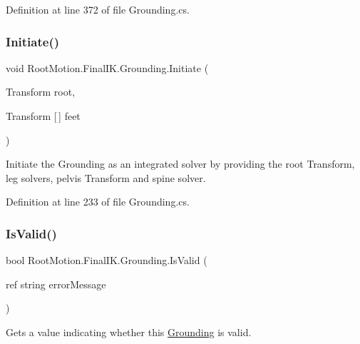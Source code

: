 Definition at line 372 of file Grounding.\+cs.

\mbox{\label{class_root_motion_1_1_final_i_k_1_1_grounding_a2e0c3b799348ec458e5049b7ed3a1969}} 
\subsubsection{\texorpdfstring{Initiate()}{Initiate()}}
{\footnotesize\ttfamily void Root\+Motion.\+Final\+I\+K.\+Grounding.\+Initiate (\begin{DoxyParamCaption}\item[{Transform}]{root,  }\item[{Transform \mbox{[}$\,$\mbox{]}}]{feet }\end{DoxyParamCaption})}



Initiate the Grounding as an integrated solver by providing the root Transform, leg solvers, pelvis Transform and spine solver. 



Definition at line 233 of file Grounding.\+cs.

\mbox{\label{class_root_motion_1_1_final_i_k_1_1_grounding_a2b6b9e638c676660bf7bd03bc08b4e72}} 
\subsubsection{\texorpdfstring{Is\+Valid()}{IsValid()}}
{\footnotesize\ttfamily bool Root\+Motion.\+Final\+I\+K.\+Grounding.\+Is\+Valid (\begin{DoxyParamCaption}\item[{ref string}]{error\+Message }\end{DoxyParamCaption})}



Gets a value indicating whether this \mbox{\hyperlink{class_root_motion_1_1_final_i_k_1_1_grounding}{Grounding}} is valid. 



